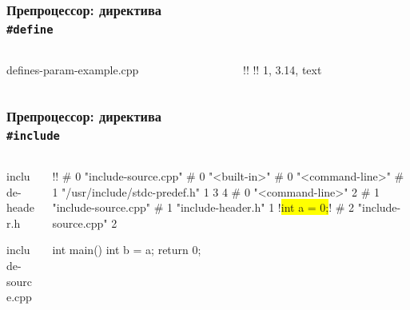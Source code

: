 \documentclass[compress]{beamer}
\begin{document}
\begin{frame}[fragile]

    \frametitle{Препроцессор: директива \\ \texttt{\#define}}

    \begin{columns}[T]

        \begin{column}{0.5\textwidth}

                {defines-param-example.cpp}

        \end{column}

        \begin{column}{0.5\textwidth}

            \begin{terminalwindow}
!!
!!
1, 3.14, text
            \end{terminalwindow}

        \end{column}

    \end{columns}

\end{frame}

\begin{frame}[fragile]

    \frametitle{Препроцессор: директива \\ \texttt{\#include}}

    \begin{columns}[T]

        \begin{column}{0.5\textwidth}

                {include-header.h}

                {include-source.cpp}

        \end{column}

        \begin{column}{0.5\textwidth}

            \begin{terminalwindow}
!!
# 0 "include-source.cpp"
# 0 "<built-in>"
# 0 "<command-line>"
# 1 "/usr/include/stdc-predef.h" 1 3 4
# 0 "<command-line>" 2
# 1 "include-source.cpp"
# 1 "include-header.h" 1
!\colorbox{yellow}{int a = 0;}!
# 2 "include-source.cpp" 2

int main() {
    int b = a;
    return 0;
}
            \end{terminalwindow}

        \end{column}

    \end{columns}

\end{frame}
\end{document}
